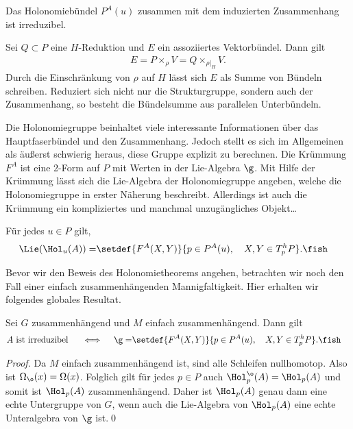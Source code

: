\documentclass[%
	paper=a5,%
	fleqn,%
	DIV=18,%
	BCOR=0mm,
	fontsize=11pt,
	titlepage=false,%
	bibliography=totoc,
	DIV=18,%
	twoside=true,
	pdftitle=Riemannsche Geometrie,
	pdfauthor=Uwe Semmelmann,
	numbers=noendperiod]%
	{scrbook}
\begin{document}
\begin{prop}
Das Holonomiebündel $P^A(u)$ zusammen mit dem induzierten Zusammenhang ist irreduzibel.\fish
\end{prop}


\begin{rem}
Sei $Q\subset P$ eine $H$-Reduktion und $E$ ein assoziiertes Vektorbündel. Dann gilt
\begin{align*}
E = P\times_{\rho} V = Q\times_{\rho\big|_{H}}V.
\end{align*}
Durch die Einschränkung von $\rho$ auf $H$ lässt sich $E$ als Summe von Bündeln schreiben. Reduziert sich nicht nur die Strukturgruppe, sondern auch der Zusammenhang, so besteht die Bündelsumme aus parallelen Unterbündeln.\map
\end{rem}

Die Holonomiegruppe beinhaltet viele interessante Informationen über das Hauptfaserbündel und den Zusammenhang. Jedoch stellt es sich im Allgemeinen als äußerst schwierig heraus, diese Gruppe explizit zu berechnen. Die Krümmung $F^A$ ist eine 2-Form auf $P$ mit Werten in der Lie-Algebra $\g$. Mit Hilfe der Krümmung lässt sich die Lie-Algebra der Holonomiegruppe angeben, welche die Holonomiegruppe in erster Näherung beschreibt. Allerdings ist auch die Krümmung ein kompliziertes und manchmal unzugängliches Objekt\ldots

\begin{prop}
Für jedes $u\in P$ gilt,
\begin{align*}
\Lie(\Hol_{u}(A)) = \span\setdef{F^A(X,Y)}{p\in P^A(u),\quad X,Y\in T_{p}^hP}.\fish
\end{align*}
\end{prop}

Bevor wir den Beweis des Holonomietheorems angehen, betrachten wir noch den Fall einer einfach zusammenhängenden Mannigfaltigkeit. 
Hier erhalten wir folgendes globales Resultat.

\begin{cor}
Sei $G$ zusammenhängend und $M$ einfach zusammenhängend. Dann gilt
\begin{align*}
A\text{ ist irreduzibel } \quad\iff\quad \g = \span\setdef{F^A(X,Y)}{p\in P^A(u),\quad X,Y\in T_{p}^hP}.\fish
\end{align*}
\end{cor}

\begin{proof}
Da $M$ einfach zusammenhängend ist, sind alle Schleifen nullhomotop. Also ist $\Omega_{\o}(x) = \Omega(x)$. Folglich gilt für jedes $p\in P$ auch $\Hol_{p}^\o(A) = \Hol_{p}(A)$ und somit ist $\Hol_{p}(A)$ zusammenhängend. Daher ist $\Hol_{p}(A)$ genau dann eine echte Untergruppe von $G$, wenn auch die Lie-Algebra von $\Hol_{p}(A)$ eine echte Unteralgebra von $\g$ ist.\qed
\end{proof}
\end{document}
